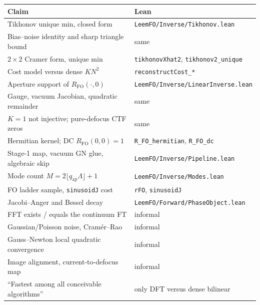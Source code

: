 \documentclass[11pt,a4paper]{article}
\theoremstyle{definition}
\theoremstyle{remark}
\newcommand{\qap}{q_{\mathrm{ap}}}
\newcommand{\RFO}{R_{\mathrm{FO}}}
\begin{document}
\begin{center}
\small
\begin{tabular}{@{}ll@{}}
\toprule
Claim & Lean \\
\midrule
Tikhonov unique min, closed form & \texttt{LeemFO/Inverse/Tikhonov.lean} \\
Bias--noise identity and sharp triangle bound & same \\
$2\times 2$ Cramer form, unique min & \texttt{tikhonovXhat2}, \texttt{tikhonov2\_unique} \\
Cost model versus dense $KN^2$ & \texttt{reconstructCost\_*} \\
Aperture support of $\RFO(\cdot,0)$ & \texttt{LeemFO/Inverse/LinearInverse.lean} \\
Gauge, vacuum Jacobian, quadratic remainder & same \\
$K=1$ not injective; pure-defocus CTF zeros & same \\
Hermitian kernel; DC $R_{\mathrm{FO}}(0,0)=1$ & \texttt{R\_FO\_hermitian}, \texttt{R\_FO\_dc} \\
Stage-1 map, vacuum GN glue, algebraic skip & \texttt{LeemFO/Inverse/Pipeline.lean} \\
Mode count $M=2\lfloor\qap\Lambda\rfloor+1$ & \texttt{LeemFO/Inverse/Modes.lean} \\
FO ladder sample, \texttt{sinusoidJ} cost & \texttt{rFO}, \texttt{sinusoidJ} \\
Jacobi--Anger and Bessel decay & \texttt{LeemFO/Forward/PhaseObject.lean} \\
\midrule
FFT exists / equals the continuum FT & informal \\
Gaussian/Poisson noise, Cram\'er--Rao & informal \\
Gauss--Newton local quadratic convergence & informal \\
Image alignment, current-to-defocus map & informal \\
``Fastest among all conceivable algorithms'' & only DFT versus dense bilinear \\
\bottomrule
\end{tabular}
\end{center}
\end{document}
